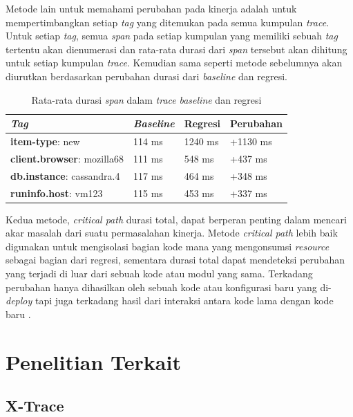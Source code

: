 Metode lain untuk memahami perubahan pada kinerja adalah untuk mempertimbangkan setiap \textit{tag} yang ditemukan pada semua kumpulan \textit{trace}. Untuk setiap \textit{tag}, semua \textit{span} pada setiap kumpulan yang memiliki sebuah \textit{tag} tertentu akan dienumerasi dan rata-rata durasi dari \textit{span} tersebut akan dihitung untuk setiap kumpulan \textit{trace}. Kemudian sama seperti metode sebelumnya akan diurutkan berdasarkan perubahan durasi dari \textit{baseline} dan regresi.
\begin{small}
	\begin{longtable}{ | p{5cm} | p{2cm} | p{2cm} | p{2cm} | }
		\caption{Rata-rata durasi \textit{span} dalam \textit{trace} \textit{baseline} dan regresi}
		\label{corr-tab-3}                                                           
		\\ \hline
		\centering\bfseries{\textit{Tag}} & \centering\bfseries{\textit{Baseline}} & \centering\bfseries{Regresi} & \centering\bfseries{Perubahan} \tabularnewline \hline
		\endfirsthead
		\textbf{item-type}: new & 114 ms & 1240 ms & +1130 ms \\ \hline
		\textbf{client.browser}: mozilla68 & 111 ms & 548 ms & +437 ms \\ \hline
		\textbf{db.instance}: cassandra.4 & 117 ms & 464 ms & +348 ms \\ \hline
		\textbf{runinfo.host}: vm123 & 115 ms & 453 ms & +337 ms \\ \hline
	\end{longtable}
\end{small}

Kedua metode, \textit{critical path} durasi total, dapat berperan penting dalam mencari akar masalah dari suatu permasalahan kinerja. Metode \textit{critical path} lebih baik digunakan untuk mengisolasi bagian kode mana yang mengonsumsi \textit{resource} sebagai bagian dari regresi, sementara durasi total dapat mendeteksi perubahan yang terjadi di luar dari sebuah kode atau modul yang sama. Terkadang perubahan hanya dihasilkan oleh sebuah kode atau konfigurasi baru yang di-\textit{deploy} tapi juga terkadang hasil dari interaksi antara kode lama dengan kode baru \citep{parker2020distributed}. 

\section{Penelitian Terkait}
\label{terkait}

\subsection{X-Trace}

